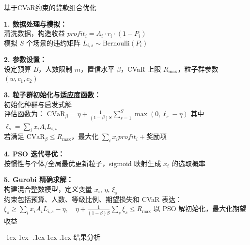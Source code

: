 \documentclass{write_paper}
\makeatletter
\renewcommand\subsection{\@startsection{subsection}{2}{\z@}%
                                     {-1ex\@plus -1ex \@minus -.1ex}%
                                     {1ex \@plus .1ex}%
                                     {\normalfont \normalsize \bfseries}}
\makeatother
\begin{document}
 \begin{algorithm}[htbp]  \footnotesize
\caption{基于CVaR约束的贷款组合优化}
\label{alg:cvar_model}

\textbf{1. 数据处理与模拟：} \\
清洗数据，构造收益 $profit_i = A_i \cdot r_i \cdot (1 - P_i)$ \\
模拟 $S$ 个场景的违约矩阵 $L_{i,s} \sim \text{Bernoulli}(P_i)$

\textbf{2. 参数设置：} \\
设定预算 $B$，人数限制 $m$，置信水平 $\beta$，CVaR 上限 $R_{\max}$，粒子群参数 $(w, c_1, c_2)$

\textbf{3. 粒子群初始化与适应度函数：} \\
初始化种群与启发式解 \\
评估函数为：
\(
\text{CVaR}_\beta = \eta + \frac{1}{(1-\beta)S} \sum_{s=1}^S \max(0, \ell_s - \eta)
\)
其中 $\ell_s = \sum_i x_i A_i L_{i,s}$ \\
若满足 $\text{CVaR}_\beta \leq R_{\max}$，最大化 $\sum_i x_i profit_i + \text{奖励项}$

\textbf{4. PSO 迭代寻优：} \\
按惯性与个体/全局最优更新粒子，sigmoid 映射生成 $x_i$ 的选取概率

\textbf{5. Gurobi 精确求解：} \\
构建混合整数模型，定义变量 $x_i$, $\eta$, $\xi_s$ \\
约束包括预算、人数、等级比例、期望损失和 CVaR 表达：
\(
\xi_s \geq \sum_i x_i A_i L_{i,s} - \eta,\quad \eta + \frac{1}{(1-\beta)S} \sum_s \xi_s \leq R_{\max}
\)
以 PSO 解初始化，最大化期望收益
\end{algorithm}

\subsection{结果分析}
\label{subsec:result_analysis}
\end{document}
